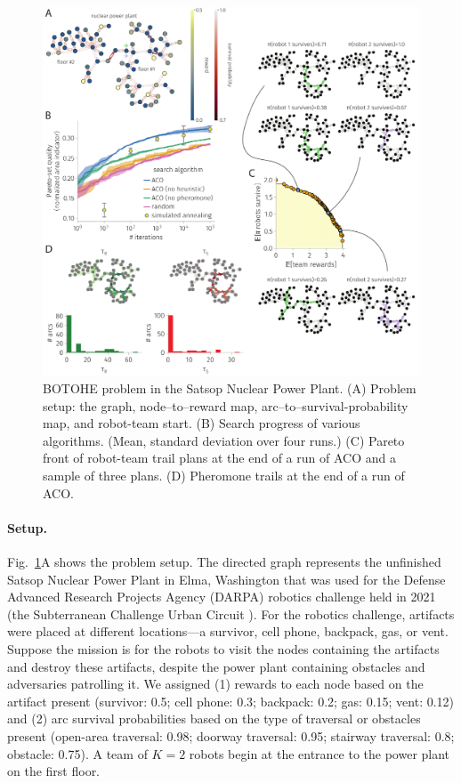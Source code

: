 \documentclass[fleqn,10pt,lineno]{wlpeerj}
\begin{document}
\begin{figure}[h!]
    \centering
    	\includegraphics[width=\textwidth]{power_plant_results.pdf}
    \caption{
    BOTOHE problem in the Satsop Nuclear Power Plant. 
    (A) Problem setup: the graph, node--to--reward map, arc--to--survival-probability map, and robot-team start.
    (B) Search progress of various algorithms. (Mean, standard deviation over four runs.)
    (C) Pareto front of robot-team trail plans at the end of a run of ACO and a sample of three plans.
    (D) Pheromone trails at the end of a run of ACO.
    } \label{fig:power_plant}
\end{figure}

\paragraph{Setup.} 
Fig.~\ref{fig:power_plant}A shows the problem setup.
The directed graph represents the unfinished Satsop Nuclear Power Plant in Elma, Washington that was used for the Defense Advanced Research Projects Agency (DARPA) robotics challenge held in 2021 \cite{ackerman2022robots,orekhov2022darpa} (the Subterranean Challenge Urban Circuit \cite{github_darpa_subt}). For the robotics challenge, artifacts were placed at different locations---a survivor, cell phone, backpack, gas, or vent.
Suppose the mission is for the robots to visit the nodes containing the artifacts and destroy these artifacts, despite the power plant containing obstacles and adversaries patrolling it. 
We assigned 
(1) rewards to each node based on the artifact present 
(survivor: 0.5; cell phone: 0.3; backpack: 0.2; gas: 0.15; vent: 0.12)
and
(2) arc survival probabilities based on the type of traversal or obstacles present
(open-area traversal: 0.98; doorway traversal: 0.95; stairway traversal: 0.8; obstacle: 0.75). A team of $K=2$ robots begin at the entrance to the power plant on the first floor.
\end{document}
